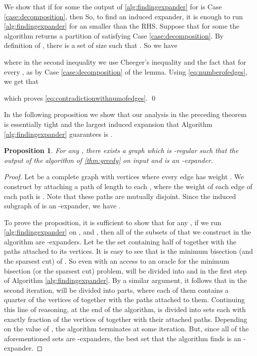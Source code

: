 \documentclass[11pt]{article}
\newtheorem{proposition}[theorem]{Proposition}
\newenvironment{proofof}[1]{{\em Proof of #1.}}{\hfill \qed}
\begin{document}
\begin{proofof}{\autoref{thm:greedy}}
We show that if for some  the output of \autoref{alg:findingexpander} for  is Case \ref{case:decomposition}, then 
So, to find an induced expander, it is enough to run \autoref{alg:findingexpander} for an  smaller than the RHS.
Suppose that for some  the algorithm returns a partition  of 
 satisfying Case \ref{case:decomposition}. 
By definition 
of , there is a set  of size  
such that . So we have  

where in the second inequality we use Cheeger's inequality and the fact that for every ,  as  by Case \ref{case:decomposition} of the 
lemma.
Using \eqref{eq:numberofedges}, 
we get that

which proves \eqref{eq:contradictionwithnumofedges}.
\end{proofof}
\newline

In the following proposition we show that our analysis in the preceding theorem is essentially 
tight and the largest induced expansion that Algorithm \ref{alg:findingexpander} guarantees is . 
\begin{proposition}\label{prop:tightgreedy}
For any , there exists a graph  which is -regular such that the output of the algorithm of \autoref{thm:greedy} on input  and  is an  -expander. 
\end{proposition}
\begin{proof}
Let  be a complete graph with  vertices where every edge has weight . We construct  by attaching a path  of length  to each , where the weight of each edge of each path is .  Note that these paths are mutually disjoint. Since the induced subgraph  of  is an -expander, we have .


To prove the proposition, it is sufficient to show that for any ,  if we run  \autoref{alg:findingexpander} on ,  and , then
all of the subsets of  that we construct in the algorithm are -expanders. 
Let  be the set containing half of  together with the paths attached to its vertices. It is easy to see that  is the minimum bisection (and the sparsest cut) of . 
So even with an access to an oracle for the minimum bisection (or the sparsest cut) problem,
 will be divided into  and  in the first step of Algorithm \ref{alg:findingexpander}. By a similar argument, it follows that in the second iteration,  will be divided into  parts, where each of them contains a quarter of the vertices of  together with the paths attached to them. Continuing this line of reasoning, at the end of the algorithm,  is divided into  sets each with exactly  fraction of the vertices of  together with their attached paths. 
Depending on the value of , the algorithm terminates at some iteration. But, since  all of the aforementioned sets are -expanders, the best set that the algorithm  finds is an -expander.
\end{proof}
\end{document}
